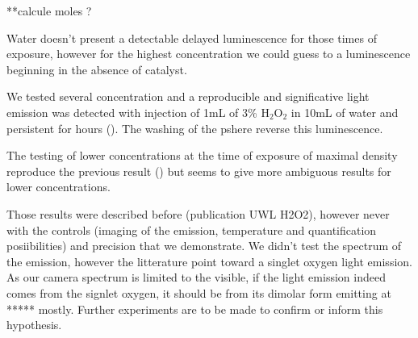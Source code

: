 **calcule moles ?

Water doesn't present a detectable delayed luminescence for those times of exposure, however for the highest concentration we could guess to a luminescence beginning in the absence of catalyst.

We tested several concentration and a reproducible and significative light emission was detected with injection of 1mL of 3\% H$_2$O$_2$ in 10mL of water and persistent for hours ().
The washing of the pshere reverse this luminescence.

The testing of lower concentrations at the time of exposure of maximal density reproduce the previous result () but seems to give more ambiguous results for lower concentrations.


Those results were described before (publication UWL H2O2), however never with the controls (imaging of the emission, temperature and quantification posiibilities) and precision that we demonstrate.
We didn't test the spectrum of the emission, however the litterature point toward a singlet oxygen light emission. As our camera spectrum is limited to the visible, if the light emission indeed comes from the signlet oxygen, it should be from its dimolar form emitting at ***** mostly.
Further experiments are to be made to confirm or inform this hypothesis.
